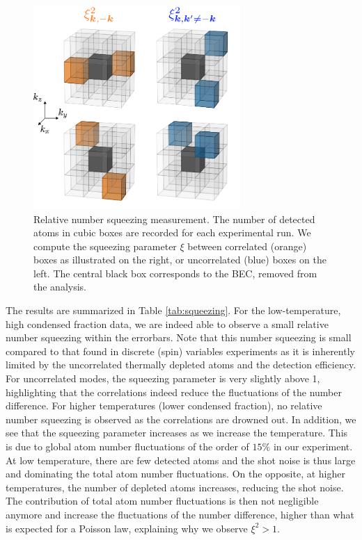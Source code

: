 \begin{figure}
    \centering
    \includegraphics[width=0.7\textwidth]{Fig/Chapter4/squeezing.png}
    \caption{Relative number squeezing measurement. The number of detected atoms in cubic boxes are recorded for each experimental run. We compute the squeezing parameter $\xi$ between correlated (orange) boxes as illustrated on the right, or uncorrelated (blue) boxes on the left. The central black box corresponds to the BEC, removed from the analysis.}
    \label{fig:squeezing}
\end{figure}

The results are summarized in Table \ref{tab:squeezing}. For the low-temperature, high condensed fraction data, we are indeed able to observe a small relative number squeezing within the errorbars. Note that this number squeezing is small compared to that found in discrete (spin) variables experiments \cite{bucker2011,esteve2008squeezing, pezze2018} as it is inherently limited by the uncorrelated thermally depleted atoms and the detection efficiency. For uncorrelated modes, the squeezing parameter is very slightly above 1, highlighting that the correlations indeed reduce the fluctuations of the number difference. For higher temperatures (lower condensed fraction), no relative number squeezing is observed as the correlations are drowned out. In addition, we see that the squeezing parameter increases as we increase the temperature. This is due to global atom number fluctuations of the order of $15\%$ in our experiment. At low temperature, there are few detected atoms and the shot noise is thus large and dominating the total atom number fluctuations. On the opposite, at higher temperatures, the number of depleted atoms increases, reducing the shot noise. The contribution of total atom number fluctuations is then not negligible anymore and increase the fluctuations of the number difference, higher than what is expected for a Poisson law, explaining why we observe $\xi^2 > 1$.


